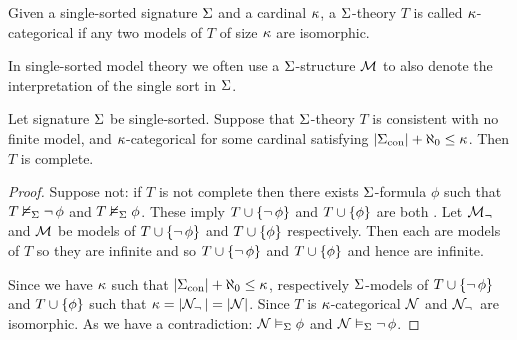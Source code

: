 \begin{dfn}[Categoricity]
    Given a single-sorted signature $\Sigma$
    and a cardinal $\kappa$,
    a $\Sigma$-theory $T$ is called $\kappa$-categorical 
    if any two models of $T$ of size $\kappa$ are isomorphic.
\end{dfn}

\begin{nttn}
    In single-sorted model theory we often use a $\Sigma$-structure $\mathcal{M}$
    to also denote the interpretation of the single sort in $\Sigma$.
\end{nttn}

\begin{prop}
    Let signature $\Sigma$ be single-sorted.
    Suppose that $\Sigma$-theory $T$ is consistent
    with no finite model, 
    and $\kappa$-categorical 
    for some cardinal satisfying 
    $|{\Sigma}_\mathrm{con}| + \aleph_0 \leq \kappa$.
    Then $T$ is complete.
\end{prop}
\begin{proof}
    Suppose not: if $T$ is not complete then there exists
    $\Sigma$-formula $\phi$ such that $T \nvDash_{\Sigma} \neg\, \phi$ and 
    $T \nvDash_{\Sigma} \phi$.
    These imply $T \cup \left\{\neg\, \phi\right\}$
    and $T \cup \left\{\phi\right\}$ are both
    .
    Let $\mathcal{M}_\neg\,$ and $\mathcal{M}$ be models of  
    $T \cup \left\{\neg\, \phi\right\}$ and $T \cup \left\{\phi\right\}$
    respectively.
    Then each are models of $T$ so they are infinite
    and so $T \cup \left\{\neg\, \phi\right\}$ and $T \cup \left\{\phi\right\}$
    and hence are infinite.

    Since we have $\kappa$ such that $|{\Sigma}_\mathrm{con}| + \aleph_0 \leq \kappa$, 
     respectively $\Sigma$-models of 
        $T \cup \left\{\neg\, \phi\right\}$ and $T \cup \left\{\phi\right\}$
        such that 
        $\kappa = |{\mathcal{N}_\neg\,}| = |{\mathcal{N}}|$.
    Since $T$ is $\kappa$-categorical
    $\mathcal{N}$ and $\mathcal{N}_\neg\,$ are isomorphic.
    As  we have a contradiction:
    $\mathcal{N} \vDash_{\Sigma} \phi$ and $\mathcal{N} \vDash_{\Sigma} \neg\, \phi$.
\end{proof}

